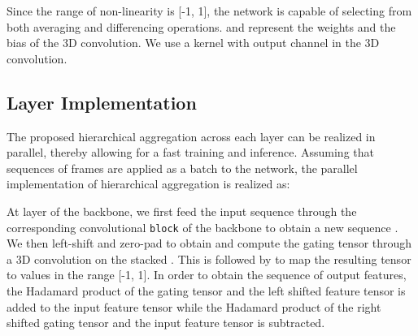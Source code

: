 \documentclass[journal,onecolumn]{IEEEtran}
\begin{document}
Since the range of  non-linearity is [-1, 1], the network is capable of selecting from both averaging and differencing operations.  and  represent the weights and the bias of the 3D convolution. We use a  kernel with  output channel in the 3D convolution. 
















\subsection{Layer Implementation}

The proposed hierarchical aggregation across each layer can be realized in parallel, thereby allowing for a fast training and inference. Assuming that sequences of frames are applied as a batch to the network, the parallel implementation of hierarchical aggregation is realized as:






At layer  of the backbone, we first feed the input sequence  through the corresponding convolutional \verb+block+ of the backbone to obtain a new sequence . We then left-shift and zero-pad to obtain  and compute the gating tensor  through a 3D convolution on the stacked . This is followed by  to map the resulting tensor to values in the range [-1, 1]. In order to obtain the sequence  of output features, the Hadamard product of the gating tensor  and the left shifted feature tensor  is added to the input feature tensor  while the Hadamard product of the right shifted gating tensor  and the input feature tensor  is subtracted.
\end{document}
